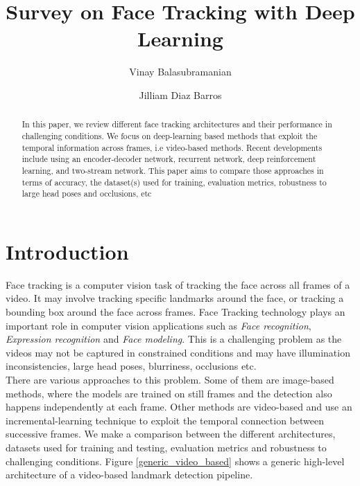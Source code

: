 \documentclass{llncs}
\begin{document}
\pagestyle{headings}  %

%
\title{Survey on Face Tracking with Deep Learning}
%
%
\author{Vinay Balasubramanian \and Jilliam Diaz Barros}
%
%

\maketitle              %

\begin{abstract}
In this paper, we review different face tracking architectures and their performance in challenging conditions. We focus on deep-learning based methods that exploit the temporal information across frames, i.e video-based methods. Recent developments include using an encoder-decoder network, recurrent network, deep reinforcement learning, and two-stream network. This paper aims to compare those approaches in terms of accuracy, the dataset(s) used for training, evaluation metrics, robustness to large head poses and occlusions, etc
\end{abstract}


\section{Introduction}
Face tracking is a computer vision task of tracking the face across all frames of a video. It may involve tracking specific landmarks around the face, or tracking a bounding box around the face across frames.
Face Tracking technology plays an important role in computer vision applications such as \textit{Face recognition}\cite{face_recognition}, \textit{Expression recognition}\cite{expression_recognition} and \textit{Face modeling}\cite{face_modeling}. This is a challenging problem as the videos may not be captured in constrained conditions and may have illumination inconsistencies, large head poses, blurriness, occlusions etc.\\

There are various approaches to this problem. Some of them are image-based methods, where the models are trained on still frames and the detection also happens independently at each frame. Other methods are video-based and use an incremental-learning technique to exploit the temporal connection between successive frames. We make a comparison between the different architectures, datasets used for training and testing, evaluation metrics and robustness to challenging conditions. Figure \ref{generic_video_based} shows a generic high-level architecture of a video-based landmark detection pipeline.
\end{document}
